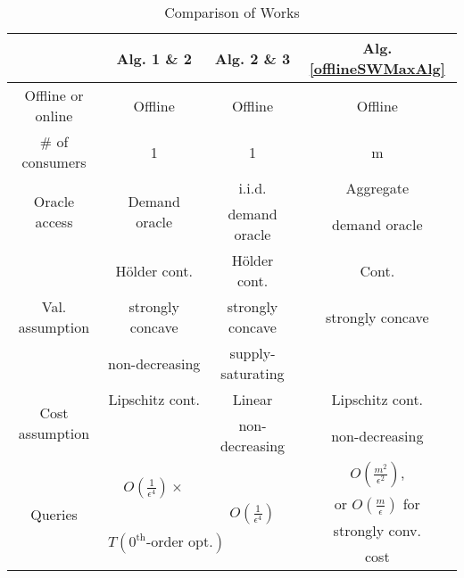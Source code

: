 \begin{table}
\begin{tabular}{|c|c|c|c|} %
    \hline
     & \cite{RUW16} Alg. 1 \& 2 & \cite{RSUW17} Alg. 2 \& 3 & Alg. \ref{offlineSWMaxAlg}\\ %
     \hline
    Offline or online & Offline & Offline & Offline\\ %
    \hline
    \# of consumers & 1 & 1 & m \\ %
    \hline
    \multirow{2}{*}{Oracle access} & \multirow{2}{*}{Demand oracle} & i.i.d. & Aggregate\\ %
     & & demand oracle & demand oracle\\ %
    \hline
    \multirow{3}{*}{Val. assumption}  & H\"older cont. & H\"older cont. & Cont.\\ %
     & strongly concave & strongly concave & strongly concave\\ %
     & non-decreasing & supply-saturating & \\ %
    \hline
    \multirow{2}{*}{Cost assumption} & Lipschitz cont. & Linear & Lipschitz cont.\\ %
     & & non-decreasing & non-decreasing\\ %
    \hline
    \multirow{4}{*}{Queries} & \multirow{2}{*}{$O(\frac{1}{\epsilon^4})\times$} & \multirow{4}{*}{$O(\frac{1}{\epsilon^4})$} & $O(\frac{m^2}{\epsilon^2})$, \\ %
     & & & or $O(\frac{m}{\epsilon})$ for \\ %
     & \multirow{2}{*}{$T(0^{\mathrm{th}}\textrm{-order opt.})$} & & strongly conv. \\ %
     & & & cost \\ %
     \hline
\end{tabular}
\caption{Comparison of Works}
\label{comparison}
\end{table}


